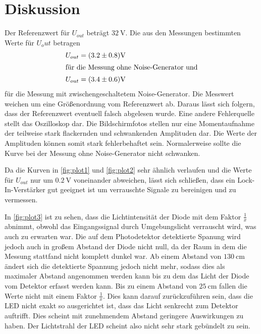 \section{Diskussion}
\label{sec:Diskussion}

Der Referenzwert für $U_{out}$ beträgt $\qty{32}{\volt}$.
Die aus den Messungen bestimmten Werte für $U_out$ betragen
\begin{align*}
    U_{out} &= (3.2 \pm 0.8) \si{\volt}\\
    \intertext{für die Messung ohne Noise-Generator und}
    U_{out} &= (3.4 \pm 0.6) \si{\volt}
\end{align*}
für die Messung mit zwischengeschaltetem Noise-Generator.
Die Messwert weichen um eine Größenordnung vom Referenzwert ab. Daraus lässt sich folgern, dass der Referenzwert eventuell falsch abgelesen wurde.
Eine andere Fehlerquelle stellt das Oszilloskop dar. Die Bildschirmfotos stellen nur eine Momentaufnahme der teilweise stark flackernden und schwankenden 
Amplituden dar. Die Werte der Amplituden können somit stark fehlerbehaftet sein. Normalerweise sollte die Kurve bei der Messung ohne Noise-Generator nicht
schwanken.

Da die Kurven in \autoref{fig:plot1} und \autoref{fig:plot2} sehr ähnlich verlaufen und die Werte für $U_{out}$ nur um $\qty{0.2}{\volt}$ voneinander abweichen,
lässt sich schließen, dass ein Lock-In-Verstärker gut geeignet ist um verrauschte Signale zu bereinigen und zu vermessen.


In \autoref{fig:plot3} ist zu sehen, dass die Lichtintensität der Diode mit dem Faktor $\frac{1}{x}$ abnimmt, obwohl das Eingangssignal durch Umgebungslicht verrauscht wird, was auch zu erwarten war.
Die auf dem Photodetektor detektierte Spanung wird jedoch auch in großem Abstand der Diode nicht null, da der Raum in dem die Messung stattfand nicht komplett dunkel war.
Ab einem Abstand von $\qty{130}{\centi\meter}$ ändert sich die detektierte Spannung jedoch nicht mehr, sodass dies als maximaler Abstand angenommen werden kann
bis zu dem das Licht der Diode vom Detektor erfasst werden kann.
Bis zu einem Abstand von $\qty{25}{\centi\meter}$ fallen die Werte nicht mit einem Faktor $\frac{1}{x}$. Dies kann darauf zurückzuführen sein,
dass die LED nicht exakt so ausgerichtet ist, dass das Licht senkrecht zum Detektor auftrifft. Dies scheint mit zunehmendem Abstand geringere Auswirkungen
zu haben. Der Lichtstrahl der LED scheint also nicht sehr stark gebündelt zu sein.
